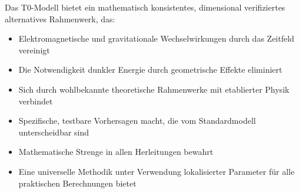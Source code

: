 \documentclass[12pt,a4paper]{article}
\begin{document}
	\begin{tcolorbox}[colback=green!5!white,colframe=green!75!black,title=T0-Modell: Ein vereinheitlichtes Rahmenwerk]
		Das T0-Modell bietet ein mathematisch konsistentes, dimensional verifiziertes alternatives Rahmenwerk, das:
		\begin{itemize}
			\item Elektromagnetische und gravitationale Wechselwirkungen durch das Zeitfeld vereinigt
			\item Die Notwendigkeit dunkler Energie durch geometrische Effekte eliminiert
			\item Sich durch wohlbekannte theoretische Rahmenwerke mit etablierter Physik verbindet
			\item Spezifische, testbare Vorhersagen macht, die vom Standardmodell unterscheidbar sind
			\item Mathematische Strenge in allen Herleitungen bewahrt
			\item Eine universelle Methodik unter Verwendung lokalisierter Parameter für alle praktischen Berechnungen bietet
		\end{itemize}
	\end{tcolorbox}
	
\end{document}
